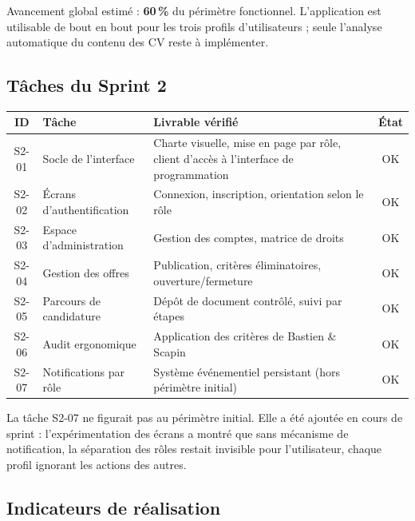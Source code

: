 \documentclass[11pt,a4paper]{article}
\begin{document}
\vspace{2mm}
\noindent Avancement global estimé : \textbf{60\,\%} du périmètre fonctionnel. L'application est utilisable de bout en bout pour les trois profils d'utilisateurs ; seule l'analyse automatique du contenu des CV reste à implémenter.

\subsection{Tâches du Sprint 2}

\begin{center}
\small
\begin{tabular}{clp{6.6cm}c}
  \toprule
  \textbf{ID} & \textbf{Tâche} & \textbf{Livrable vérifié} & \textbf{État} \\
  \midrule
  S2-01 & Socle de l'interface & Charte visuelle, mise en page par rôle, client d'accès à l'interface de programmation & \textcolor{vert}{OK} \\
  S2-02 & Écrans d'authentification & Connexion, inscription, orientation selon le rôle & \textcolor{vert}{OK} \\
  S2-03 & Espace d'administration & Gestion des comptes, matrice de droits & \textcolor{vert}{OK} \\
  S2-04 & Gestion des offres & Publication, critères éliminatoires, ouverture/fermeture & \textcolor{vert}{OK} \\
  S2-05 & Parcours de candidature & Dépôt de document contrôlé, suivi par étapes & \textcolor{vert}{OK} \\
  S2-06 & Audit ergonomique & Application des critères de Bastien \& Scapin & \textcolor{vert}{OK} \\
  \midrule
  S2-07 & Notifications par rôle & Système événementiel persistant (hors périmètre initial) & \textcolor{vert}{OK} \\
  \bottomrule
\end{tabular}
\end{center}

\vspace{2mm}
\noindent La tâche S2-07 ne figurait pas au périmètre initial. Elle a été ajoutée en cours de sprint : l'expérimentation des écrans a montré que sans mécanisme de notification, la séparation des rôles restait invisible pour l'utilisateur, chaque profil ignorant les actions des autres.

\subsection{Indicateurs de réalisation}
\end{document}

